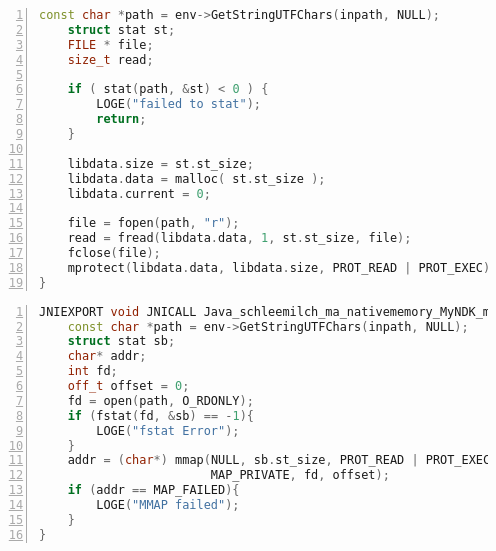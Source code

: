 \begin{appendices}
\begin{lstlisting}[language=C++, caption=File Mapping with malloc(), label=file_mapping_malloc, numbers=left]
    const char *path = env->GetStringUTFChars(inpath, NULL);
    struct stat st;
    FILE * file;
    size_t read;

    if ( stat(path, &st) < 0 ) {
        LOGE("failed to stat");
        return;
    }

    libdata.size = st.st_size;
    libdata.data = malloc( st.st_size );
    libdata.current = 0;

    file = fopen(path, "r");
    read = fread(libdata.data, 1, st.st_size, file);
    fclose(file);
    mprotect(libdata.data, libdata.size, PROT_READ | PROT_EXEC)
}
\end{lstlisting}
\begin{lstlisting}[language=C++, caption=File Mapping with mmap(), label=file_mapping_mmap, numbers=left]
JNIEXPORT void JNICALL Java_schleemilch_ma_nativememory_MyNDK_mmapFile (JNIEnv *env, jobject obj, jstring inpath){
    const char *path = env->GetStringUTFChars(inpath, NULL);
    struct stat sb;
    char* addr;
    int fd;
    off_t offset = 0;
    fd = open(path, O_RDONLY);
    if (fstat(fd, &sb) == -1){
        LOGE("fstat Error");
    }
    addr = (char*) mmap(NULL, sb.st_size, PROT_READ | PROT_EXEC,
                        MAP_PRIVATE, fd, offset);
    if (addr == MAP_FAILED){
        LOGE("MMAP failed");
    }
}
\end{lstlisting}
\end{appendices}